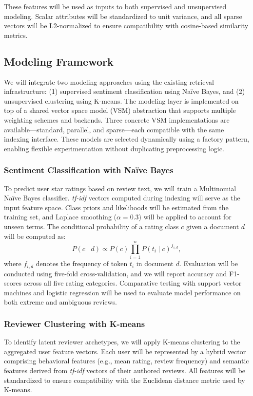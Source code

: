 These features will be used as inputs to both supervised and unsupervised modeling. Scalar attributes will be standardized to unit variance, and all sparse vectors will be L2-normalized to ensure compatibility with cosine-based similarity metrics.

\subsection{Modeling Framework}
We will integrate two modeling approaches using the existing retrieval infrastructure: (1) supervised sentiment classification using Na\"ive Bayes, and (2) unsupervised clustering using K-means. The modeling layer is implemented on top of a shared vector space model (VSM) abstraction that supports multiple weighting schemes and backends. Three concrete VSM implementations are available—standard, parallel, and sparse—each compatible with the same indexing interface. These models are selected dynamically using a factory pattern, enabling flexible experimentation without duplicating preprocessing logic.

\subsubsection{Sentiment Classification with Na\"ive Bayes}
To predict user star ratings based on review text, we will train a Multinomial Na\"ive Bayes classifier. \textit{tf-idf} vectors computed during indexing will serve as the input feature space. Class priors and likelihoods will be estimated from the training set, and Laplace smoothing (\( \alpha = 0.3 \)) will be applied to account for unseen terms. The conditional probability of a rating class \( c \) given a document \( d \) will be computed as:
\[
P(c \mid d) \propto P(c) \prod_{i=1}^{n} P(t_i \mid c)^{f_{i,d}},
\]
where \( f_{i,d} \) denotes the frequency of token \( t_i \) in document \( d \). Evaluation will be conducted using five-fold cross-validation, and we will report accuracy and F1-scores across all five rating categories. Comparative testing with support vector machines and logistic regression will be used to evaluate model performance on both extreme and ambiguous reviews.

\subsubsection{Reviewer Clustering with K-means}
To identify latent reviewer archetypes, we will apply K-means clustering to the aggregated user feature vectors. Each user will be represented by a hybrid vector comprising behavioral features (e.g., mean rating, review frequency) and semantic features derived from \textit{tf-idf} vectors of their authored reviews. All features will be standardized to ensure compatibility with the Euclidean distance metric used by K-means.

